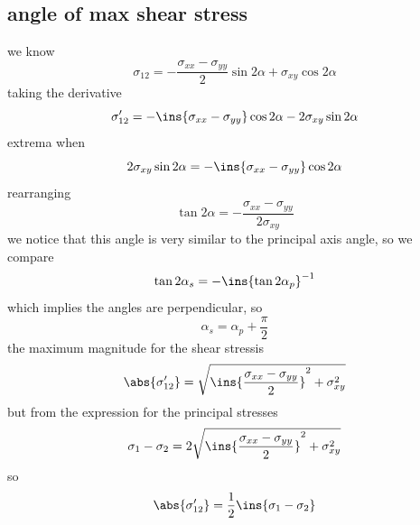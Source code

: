 \subsection{angle of max shear stress}
we know 
\begin{equation}
    \sigma_{12}=-\frac{\sigma_{xx}-\sigma_{yy}}{2}\sin2\alpha+\sigma_{xy}\cos2\alpha
\end{equation}
taking the derivative
\begin{equation}
    \sigma'_{12}=-\ins{\sigma_{xx}-\sigma_{yy}}\cos2\alpha-2\sigma_{xy}\sin2\alpha
\end{equation}
extrema when 
\begin{equation}
    2\sigma_{xy}\sin2\alpha=-\ins{\sigma_{xx}-\sigma_{yy}}\cos2\alpha
\end{equation}
rearranging 
\begin{equation}
    \tan2\alpha = -\frac{\sigma_{xx}-\sigma_{yy}}{2\sigma_{xy}}
\end{equation}
we notice that this angle is very similar to the principal axis angle, so we compare 
\begin{equation}
    \tan2\alpha_s = -\ins{\tan2\alpha_p}^{-1}
\end{equation}
which implies the angles are perpendicular, so 
\begin{equation}
    \alpha_s = \alpha_p+\frac{\pi}{2}
\end{equation}
the maximum magnitude for the shear stressis 
\begin{equation}
    \abs{\sigma'_{12}}=\sqrt{\ins{\frac{\sigma_{xx}-\sigma_{yy}}{2}}^2+\sigma_{xy}^2}
\end{equation}
but from the expression for the principal stresses 
\begin{equation}
    \sigma_1-\sigma_2=2\sqrt{\ins{\frac{\sigma_{xx}-\sigma_{yy}}{2}}^2+\sigma_{xy}^2}
\end{equation}
so 
\begin{equation}
    \abs{\sigma'_{12}}=\frac{1}{2}\ins{\sigma_1-\sigma_2}
\end{equation}

